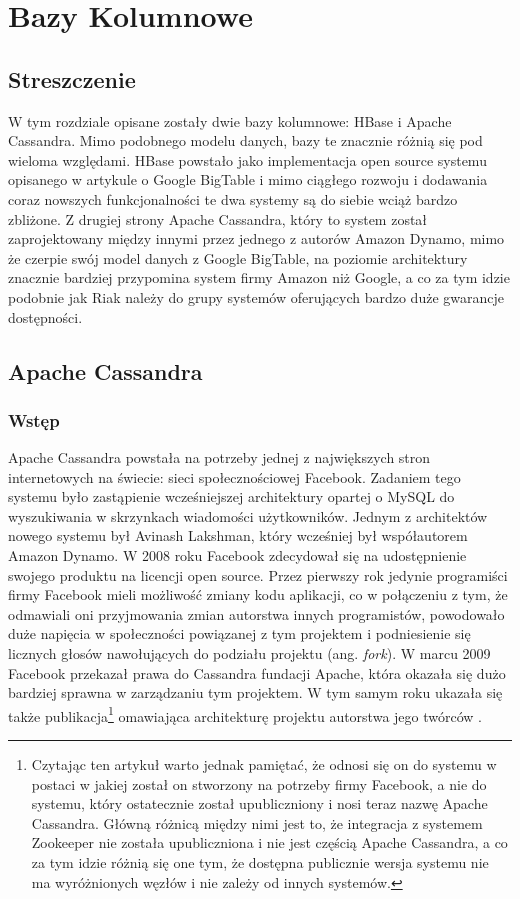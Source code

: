 \chapter{Bazy Kolumnowe}

\section*{Streszczenie}
W tym rozdziale opisane zostały dwie bazy kolumnowe: HBase i Apache Cassandra.
Mimo podobnego modelu danych, bazy te znacznie różnią się pod wieloma względami.
HBase powstało jako implementacja open source systemu opisanego w artykule o Google BigTable i mimo ciągłego rozwoju i dodawania coraz nowszych funkcjonalności te dwa systemy są do siebie wciąż bardzo zbliżone.
Z drugiej strony Apache Cassandra, który to system został zaprojektowany między innymi przez jednego z autorów Amazon Dynamo, mimo że czerpie swój model danych z Google BigTable, na poziomie architektury znacznie bardziej przypomina system firmy Amazon niż Google, a co za tym idzie podobnie jak Riak należy do grupy systemów oferujących bardzo duże gwarancje dostępności.

\section{Apache Cassandra}
\label{sec:cassandra}

\subsection*{Wstęp}

Apache Cassandra powstała na potrzeby jednej z największych stron internetowych na świecie: sieci społecznościowej Facebook. 
Zadaniem tego systemu było zastąpienie wcześniejszej architektury opartej o MySQL do wyszukiwania w skrzynkach wiadomości użytkowników.
Jednym z architektów nowego systemu był Avinash Lakshman, który wcześniej był współautorem Amazon Dynamo.
W 2008 roku Facebook zdecydował się na udostępnienie swojego produktu na licencji open source.
Przez pierwszy rok jedynie programiści firmy Facebook mieli możliwość zmiany kodu aplikacji, co w połączeniu z tym, że odmawiali oni przyjmowania zmian autorstwa innych programistów, powodowało duże napięcia w społeczności powiązanej z tym projektem i podniesienie się licznych głosów nawołujących do podziału projektu (ang. \emph{fork}).
W marcu 2009 Facebook przekazał prawa do Cassandra fundacji Apache, która okazała się dużo bardziej sprawna w zarządzaniu tym projektem\cite{evans-cassandra}.
W tym samym roku ukazała się także publikacja\footnote{Czytając ten artykuł warto jednak pamiętać, że odnosi się on do systemu w postaci w jakiej został on stworzony na potrzeby firmy Facebook, a nie do systemu, który ostatecznie został upubliczniony i nosi teraz nazwę Apache Cassandra. Główną różnicą między nimi jest to, że integracja z systemem Zookeeper nie została upubliczniona i nie jest częścią Apache Cassandra, a co za tym idzie różnią się one tym, że dostępna publicznie wersja systemu nie ma wyróżnionych węzłów i nie zależy od innych systemów.} omawiająca architekturę projektu autorstwa jego twórców \cite{cassandra-paper}.

